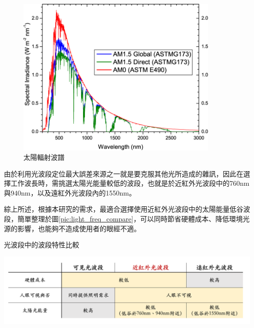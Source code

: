 \begin{description}
                \begin{figure}[htpb]
                    \centering
                    \includegraphics[width=10cm]{ch2pic/solar_spectra.png}
                    \caption{太陽輻射波譜\cite{astm}}
                    \label{pic:solar_spectrum}
                \end{figure}

                \qquad
                由於利用光波段定位最大誤差來源之一就是要克服其他光所造成的雜訊，因此在選擇工作波長時，需挑選太陽光能量較低的波段，也就是於近紅外光波段中的760nm與940nm，以及遠紅外光波段內的1550nm。
        
                \end{description}
                



                綜上所述，根據本研究的需求，最適合選擇使用近紅外光波段中的太陽能量低谷波段，簡單整理於圖\ref{pic:light_freq_compare}，可以同時節省硬體成本、降低環境光源的影響，也能夠不造成使用者的眼經不適。

                \begin{table}[htpb]
                    \caption{光波段中的波段特性比較}
                    \label{pic:light_freq_compare}
                    \centering
                    \includegraphics[width=16cm]{ch2pic/light_freq_compare.png}
                \end{table}


